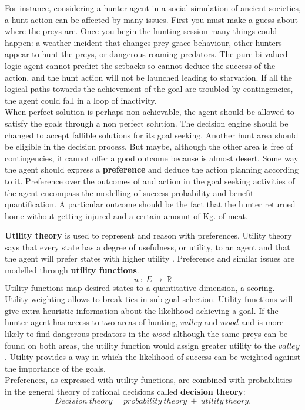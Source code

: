 \documentclass[11pt,oneside,a4paper,openright]{report}
\begin{document}
\begin{description}
\begin{description}
		For instance, considering a hunter agent in a social simulation of ancient societies, a hunt action
		can be affected by many issues. First you must make a guess about where the preys are. Once you 
		begin the hunting session many things could happen: a weather incident that changes prey grace
		behaviour, other hunters appear to hunt the preys, or dangerous roaming predators. The pure bi-valued
		logic agent cannot predict the setbacks so cannot deduce the success of the action, and the hunt 
		action will not be launched leading to starvation. If all the logical paths towards the achievement 
		of the goal are troubled by contingencies, the agent could fall in a loop of inactivity.\\ 
		When perfect solution is perhaps non achievable, the agent should be allowed to satisfy the goals
		through a non perfect solution. The decision engine should be changed to accept fallible solutions 
		for its goal seeking. Another hunt area should be eligible in the decision process. But maybe,
		although the other area is free of contingencies, it cannot offer a good outcome because is almost
		desert. Some way the agent should express a \textbf{preference} and deduce the action planning
		according to it. Preference over the outcomes of and action in the goal seeking activities of the 
		agent encompass the modelling of success probability and benefit quantification. A particular outcome
		should be the fact that the hunter returned home without getting injured and a certain amount of 
		Kg. of meat. 

		\textbf{Utility theory} is used to represent and reason with preferences. Utility theory says that
		every state has a degree of usefulness, or utility, to an agent and that the agent will prefer 
		states with higher utility \cite{RussellNorvig}. Preference and similar issues are modelled through
		\textbf{utility functions}. 
			\begin{equation}
			 u\ :\ E \rightarrow \ \mathbb{R}
			\end{equation}
		Utility functions map desired states to a quantitative dimension, a scoring. Utility weighting 
		allows to break ties in sub-goal selection. Utility functions will give extra heuristic information
		about the likelihood achieving a goal. If the hunter agent has access to two areas of hunting, $valley$
		and $wood$ and is more likely to find dangerous predators in the $wood$ although the same preys can 
		be found on both areas, the utility function would assign greater utility to the $valley$. Utility
 		provides a way in which the likelihood of success can be weighted against the importance of the goals.\\
		Preferences, as expressed with utility functions, are combined with probabilities in the general 
		theory of rational decisions called \textbf{decision theory}: \cite{RussellNorvig}
			\begin{equation}
			Decision\ theory = probability\ theory\ +\ utility\ theory .
			\end{equation}


\end{description}
\end{description}
\end{document}

